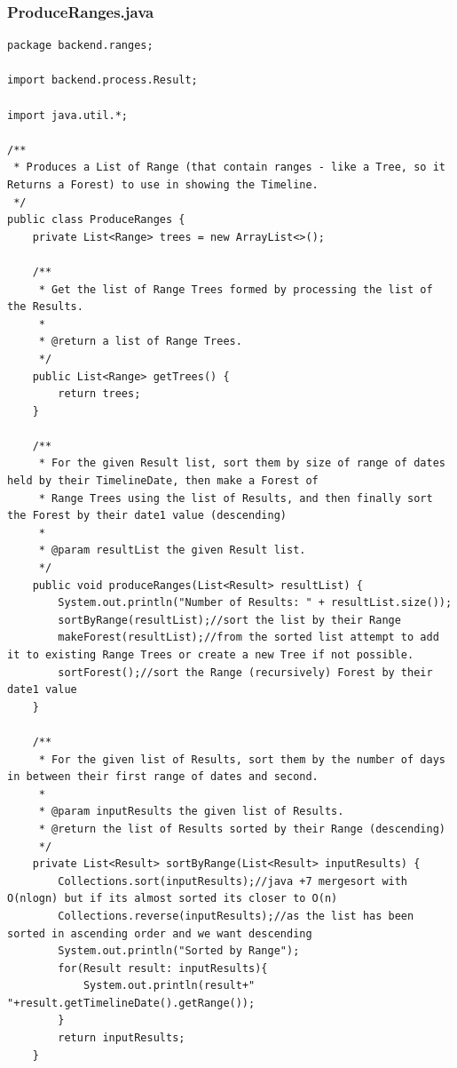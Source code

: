 \subsubsection{ProduceRanges.java}
\begin{lstlisting}
package backend.ranges;

import backend.process.Result;

import java.util.*;

/**
 * Produces a List of Range (that contain ranges - like a Tree, so it Returns a Forest) to use in showing the Timeline.
 */
public class ProduceRanges {
    private List<Range> trees = new ArrayList<>();

    /**
     * Get the list of Range Trees formed by processing the list of the Results.
     *
     * @return a list of Range Trees.
     */
    public List<Range> getTrees() {
        return trees;
    }

    /**
     * For the given Result list, sort them by size of range of dates held by their TimelineDate, then make a Forest of
     * Range Trees using the list of Results, and then finally sort the Forest by their date1 value (descending)
     *
     * @param resultList the given Result list.
     */
    public void produceRanges(List<Result> resultList) {
        System.out.println("Number of Results: " + resultList.size());
        sortByRange(resultList);//sort the list by their Range
        makeForest(resultList);//from the sorted list attempt to add it to existing Range Trees or create a new Tree if not possible.
        sortForest();//sort the Range (recursively) Forest by their date1 value
    }

    /**
     * For the given list of Results, sort them by the number of days in between their first range of dates and second.
     *
     * @param inputResults the given list of Results.
     * @return the list of Results sorted by their Range (descending)
     */
    private List<Result> sortByRange(List<Result> inputResults) {
        Collections.sort(inputResults);//java +7 mergesort with O(nlogn) but if its almost sorted its closer to O(n)
        Collections.reverse(inputResults);//as the list has been sorted in ascending order and we want descending
        System.out.println("Sorted by Range");
        for(Result result: inputResults){
            System.out.println(result+" "+result.getTimelineDate().getRange());
        }
        return inputResults;
    }


\end{lstlisting}
